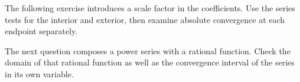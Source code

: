 The following exercise introduces a scale factor in the coefficients.
Use the series tests for the interior and exterior, then examine
absolute convergence at each endpoint separately.



The next question composes a power series with a rational function.
Check the domain of that rational function as well as the convergence
interval of the series in its own variable.



